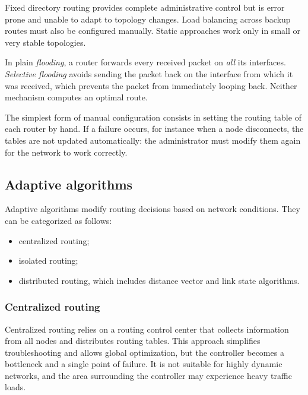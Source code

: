 Fixed directory routing provides complete administrative control but is error prone and unable to adapt to topology changes. Load balancing across backup routes must also be configured manually. Static approaches work only in small or very stable topologies.

\begin{center}
\end{center}

In plain \emph{flooding}, a router forwards every received packet on \emph{all}
its interfaces. \emph{Selective flooding} avoids sending the packet back on the
interface from which it was received, which prevents the packet from
immediately looping back. Neither mechanism computes an optimal route.

The simplest form of manual configuration consists in setting the routing table
of each router by hand. If a failure occurs, for instance when a node
disconnects, the tables are not updated automatically: the administrator must
modify them again for the network to work correctly.
\subsection{Adaptive algorithms}

Adaptive algorithms modify routing decisions based on network conditions. They can be categorized as follows:

\begin{itemize}
\item centralized routing;
\item isolated routing;
\item distributed routing, which includes distance vector and link state algorithms.
\end{itemize}

\subsubsection*{Centralized routing}

Centralized routing relies on a routing control center that collects information from all nodes and distributes routing tables. This approach simplifies troubleshooting and allows global optimization, but the controller becomes a bottleneck and a single point of failure. It is not suitable for highly dynamic networks, and the area surrounding the controller may experience heavy traffic loads.

